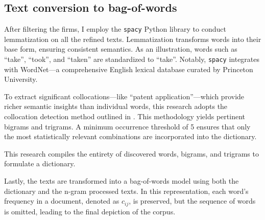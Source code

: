 \documentclass[12pt, letterpaper]{article}
\begin{document}
 

\subsection{Text conversion to bag-of-words}

After filtering the firms, I employ the \texttt{spacy} Python library to conduct lemmatization on all the refined texts. Lemmatization transforms words into their base form, ensuring consistent semantics. As an illustration, words such as ``take'', ``took'', and ``taken'' are standardized to ``take''. Notably, \texttt{spacy} integrates with WordNet---a comprehensive English lexical database curated by Princeton University.

To extract significant collocations---like ``patent application''---which provide richer semantic insights than individual words, this research adopts the collocation detection method outlined in \cite{Mikolov2013-be}. This methodology yields pertinent bigrams and trigrams. A minimum occurrence threshold of 5 ensures that only the most statistically relevant combinations are incorporated into the dictionary.

This research compiles the entirety of discovered words, bigrams, and trigrams to formulate a dictionary. 

Lastly, the texts are transformed into a bag-of-words model using both the dictionary and the n-gram processed texts. In this representation, each word's frequency in a document, denoted as \(c_{ij}\), is preserved, but the sequence of words is omitted, leading to the final depiction of the corpus.


%




\end{document}
